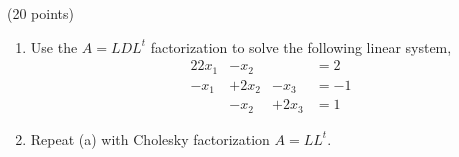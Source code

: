 \documentclass[10pt]{jhwhw}
\begin{document}

\problem{} (20 points)

	\begin{enumerate}
		\item Use the $A = LDL^t$ factorization to solve the following linear system,
			\begin{alignat*}{2}
				2x_1 &- x_2 & &= 2 \\
				-x_1 &+ 2x_2 &- x_3 &= -1 \\
				&- x_2 &+ 2x_3 &= 1
			\end{alignat*}
		\item Repeat (a) with Cholesky factorization $A = LL^t$.
	\end{enumerate}

\solution
\end{document}
